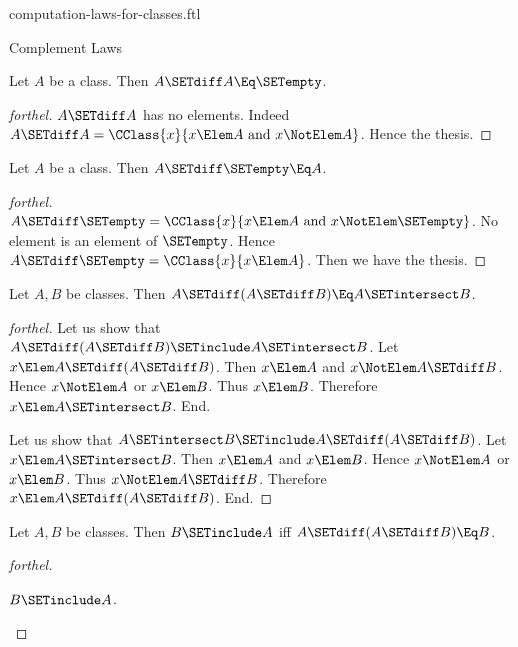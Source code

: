 \documentclass{stex}
\begin{document}
\begin{smodule}{computation-laws-for-classes.ftl}
\begin{sfragment}{Complement Laws}
  \begin{proposition}[forthel,id=FOUNDATIONS_02_7433299337150464]
    Let $A$ be a class.
    Then $A \SETdiff A \Eq \SETempty$.
  \end{proposition}
  \begin{proof}[forthel]
    $A \SETdiff A$ has no elements.
    Indeed $A \SETdiff A = \CClass{x}{x \Elem A\text{ and }x \NotElem A}$.
    Hence the thesis.
  \end{proof}

  \begin{proposition}[forthel,id=FOUNDATIONS_02_3783696985358336]
    Let $A$ be a class.
    Then $A \SETdiff \SETempty \Eq A$.
  \end{proposition}
  \begin{proof}[forthel]
    $A \SETdiff \SETempty = \CClass{x}{x \Elem A\text{ and }x \NotElem \SETempty}$.
    No element is an element of $\SETempty$.
    Hence $A \SETdiff \SETempty = \CClass{x}{x \Elem A}$.
    Then we have the thesis.
  \end{proof}

  \begin{proposition}[forthel,id=FOUNDATIONS_02_7083929257377792]
    Let $A, B$ be classes.
    Then $A \SETdiff (A \SETdiff B) \Eq A \SETintersect B$.
  \end{proposition}
  \begin{proof}[forthel]
    Let us show that $A \SETdiff (A \SETdiff B) \SETinclude A \SETintersect B$.
      Let $x \Elem A \SETdiff (A \SETdiff B)$.
      Then $x \Elem A$ and $x \NotElem A \SETdiff B$.
      Hence $x \NotElem A$ or $x \Elem B$.
      Thus $x \Elem B$.
      Therefore $x \Elem A \SETintersect B$.
    End.

    Let us show that $A \SETintersect B \SETinclude A \SETdiff (A \SETdiff B)$.
      Let $x \Elem A \SETintersect B$.
      Then $x \Elem A$ and $x \Elem B$.
      Hence $x \NotElem A$ or $x \Elem B$.
      Thus $x \NotElem A \SETdiff B$.
      Therefore $x \Elem A \SETdiff (A \SETdiff B)$.
    End.
  \end{proof}

  \begin{proposition}[forthel,id=FOUNDATIONS_02_4938646769631232]
    Let $A, B$ be classes.
    Then $B \SETinclude A$ iff $A \SETdiff (A \SETdiff B) \Eq B$.
  \end{proposition}
  \begin{proof}[forthel]
    \begin{case}{$B \SETinclude A$.} \end{case}


\end{proof}
\end{sfragment}
\end{smodule}
\end{document}
